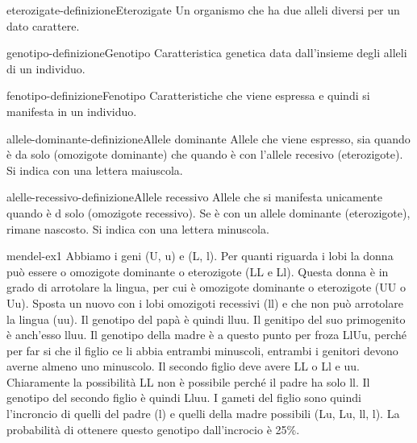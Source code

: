 \documentclass[preview]{standalone}
\begin{document}
\begin{snippetdefinition}{eterozigate-definizione}{Eterozigate}
    Un organismo che ha due alleli diversi per un dato carattere.
\end{snippetdefinition}

\begin{snippetdefinition}{genotipo-definizione}{Genotipo}
    Caratteristica genetica data dall'insieme degli alleli di un individuo.
\end{snippetdefinition}

\begin{snippetdefinition}{fenotipo-definizione}{Fenotipo}
    Caratteristiche che viene espressa e quindi si manifesta in un individuo.
\end{snippetdefinition}

\begin{snippetdefinition}{allele-dominante-definizione}{Allele dominante}
    Allele che viene espresso, sia quando è da solo (omozigote dominante) che
    quando è con l'allele recesivo (eterozigote). Si indica con una lettera maiuscola.
\end{snippetdefinition}

\begin{snippetdefinition}{alelle-recessivo-definizione}{Allele recessivo}
    Allele che si manifesta unicamente quando è d solo (omozigote recessivo).
    Se è con un allele dominante (eterozigote), rimane nascosto. Si indica con una lettera minuscola.
\end{snippetdefinition}


\begin{snippetexercise}{mendel-ex1}{}
    Abbiamo i geni (U, u) e (L, l).
    Per quanti riguarda i lobi la donna può essere o omozigote dominante o eterozigote
    (LL e Ll). Questa donna è in grado di arrotolare la lingua, per cui è
    omozigote dominante o eterozigote (UU o Uu).
    Sposta un nuovo con i lobi omozigoti recessivi (ll) e che non può arrotolare la lingua
    (uu). Il genotipo del papà è quindi lluu. Il genitipo del suo primogenito 
    è anch'esso lluu.
    Il genotipo della madre è a questo punto per froza LlUu, perché
    per far si che il figlio ce li abbia entrambi minuscoli, entrambi
    i genitori devono averne almeno uno minuscolo.
    Il secondo figlio deve avere LL o Ll e uu. Chiaramente la possibilità
    LL non è possibile perché il padre ha solo ll.
    Il genotipo del secondo figlio è quindi Lluu.
    I gameti del figlio sono quindi l'incroncio di quelli del padre (l)
    e quelli della madre possibili (Lu, Lu, ll, l).
    La probabilità di ottenere questo genotipo dall'incrocio è 25\%.
\end{snippetexercise}
\end{document}
